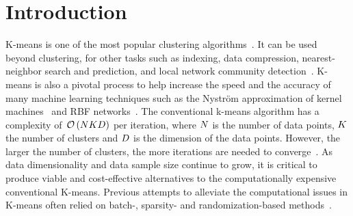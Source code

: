 \section{Introduction}

K-means is one of the most popular clustering algorithms~\cite{hartigan1979algorithm,jain2010data}. It can be used beyond clustering, for other tasks such as indexing, data compression,  nearest-neighbor search and prediction, and local network community detection~\cite{muja2014scalable,van2016local}. K-means is also a pivotal process to help increase the speed and the accuracy of many machine learning techniques such as the Nyström approximation of kernel machines~\cite{si2016computationally} and RBF networks~\cite{que2016back}.
%
The  conventional  k-means  algorithm  has  a  complexity  of~$\mathcal{O}\left (N K D\right )$ per iteration, where $N$ is the number of data points, $K$ the number of clusters and $D$ is the dimension of the data points.
However, the larger the number of clusters, the more iterations are needed to converge~\cite{arthur2006slow}.
%
As data dimensionality and data sample size continue to grow, it is critical to produce viable and cost-effective alternatives to the computationally expensive conventional K-means. 
Previous attempts to alleviate the computational issues in K-means often relied on batch-, sparsity- and randomization-based methods~\cite{Sculley2010Web, boutsidis2014randomized,shen2017compressed,liu2017sparse}. 

